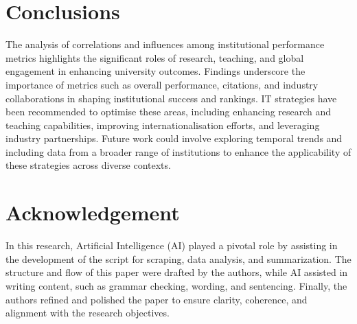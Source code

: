 \documentclass[sigconf]{acmart}
\begin{document}
\section{Conclusions}

The analysis of correlations and influences among institutional performance metrics highlights the significant roles of research, teaching, and global engagement in enhancing university outcomes. Findings underscore the importance of metrics such as overall performance, citations, and industry collaborations in shaping institutional success and rankings. IT strategies have been recommended to optimise these areas, including enhancing research and teaching capabilities, improving internationalisation efforts, and leveraging industry partnerships. Future work could involve exploring temporal trends and including data from a broader range of institutions to enhance the applicability of these strategies across diverse contexts.


\section*{Acknowledgement}

In this research, Artificial Intelligence (AI) played a pivotal role by assisting in the development of the script for scraping, data analysis, and summarization. The structure and flow of this paper were drafted by the authors, while AI assisted in writing content, such as grammar checking, wording, and sentencing. Finally, the authors refined and polished the paper to ensure clarity, coherence, and alignment with the research objectives.



\end{document}
